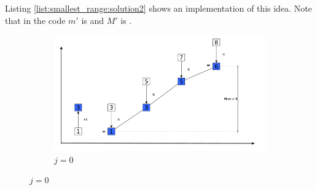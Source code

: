 Listing \ref{list:smallest_range:solution2} shows an implementation of this idea. Note that in
the code $m'$ is  and $M'$ is .


\begin{figure}[bp!]
	\centering	
	\begin{subfigure}[t]{0.99\textwidth}
			\centering
			\includegraphics[width=1\linewidth]{sources/smallest_range/images/bars2}
			\caption{$j=0$}
			\label{fig:smallest_range:bars2}
	\end{subfigure}
\end{figure}

